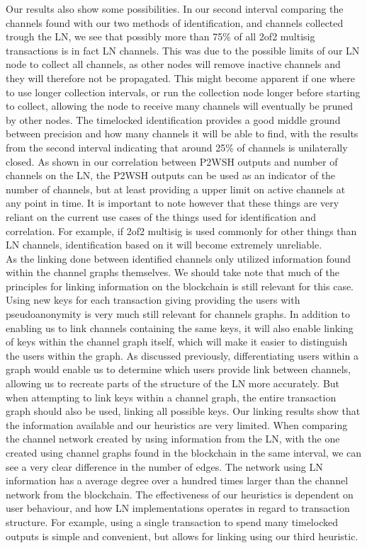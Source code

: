 Our results also show some possibilities. In our second interval comparing the channels found with our two methods of identification, and channels collected trough the LN, we see that possibly more than 75\% of all 2of2 multisig transactions is in fact LN channels. This was due to the possible limits of our LN node to collect all channels, as other nodes will remove inactive channels and they will therefore not be propagated. This might become apparent if one where to use longer collection intervals, or run the collection node longer before starting to collect, allowing the node to receive many channels will eventually be pruned by other nodes.
The timelocked identification provides a good middle ground between precision and how many channels it will be able to find, with the results from the second interval indicating that around 25\% of channels is unilaterally closed. As shown in our correlation between P2WSH outputs and number of channels on the LN, the P2WSH outputs can be used as an indicator of the number of channels, but at least providing a upper limit on active channels at any point in time. It is important to note however that these things are very reliant on the current use cases of the things used for identification and correlation. For example, if 2of2 multisig is used commonly for other things than LN channels, identification based on it will become extremely unreliable. 
\\


As the linking done between identified channels only utilized information found within the channel graphs themselves. We should take note that much of the principles for linking information on the blockchain is still relevant for this case. Using new keys for each transaction giving providing the users with pseudoanonymity is very much still relevant for channels graphs. In addition to enabling us to link channels containing the same keys, it will also enable linking of keys within the channel graph itself, which will make it easier to distinguish the users within the graph. As discussed previously, differentiating users within a graph would enable us to determine which users provide link between channels, allowing us to recreate parts of the structure of the LN more accurately. But when attempting to link keys within a channel graph, the entire transaction graph should also be used, linking all possible keys. Our linking results show that the information available and our heuristics are very limited. When comparing the channel network created by using information from the LN, with the one created using channel graphs found in the blockchain in the same interval, we can see a very clear difference in the number of edges. The network using LN information has a average degree over a hundred times larger than the channel network from the blockchain. The effectiveness of our heuristics is dependent on user behaviour, and how LN implementations operates in regard to transaction structure. For example, using a single transaction to spend many timelocked outputs is simple and convenient, but allows for linking using our third heuristic.
\\


